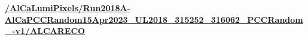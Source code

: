 \textbf{\url{/AlCaLumiPixels/Run2018A-AlCaPCCRandom15Apr2023_UL2018_315252_316062_PCCRandom_-v1/ALCARECO}}

